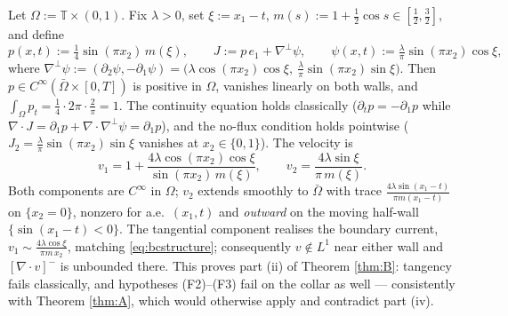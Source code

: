 \documentclass[11pt]{amsart}
\theoremstyle{definition}
\newcommand{\dive}{\nabla\!\cdot}
\newcommand{\T}{\mathbb{T}}
\begin{document}
Let $\Omega:=\T\times(0,1)$. Fix $\lambda>0$, set $\xi:=x_1-t$,
$m(s):=1+\tfrac12\cos s\in[\tfrac12,\tfrac32]$, and define
\begin{equation}\label{eq:bce}
p(x,t):=\tfrac14\sin(\pi x_2)\,m(\xi),\qquad
J:=p\,e_1+\nabla^\perp\psi,\qquad
\psi(x,t):=\tfrac{\lambda}{\pi}\sin(\pi x_2)\cos\xi,
\end{equation}
where $\nabla^\perp\psi:=(\partial_2\psi,-\partial_1\psi)=
\big(\lambda\cos(\pi x_2)\cos\xi,\ \tfrac{\lambda}{\pi}\sin(\pi
x_2)\sin\xi\big)$. Then $p\in C^\infty(\bar\Omega\times[0,T])$ is
positive in $\Omega$, vanishes linearly on both walls, and
$\int_\Omega p_t=\tfrac14\cdot2\pi\cdot\tfrac2\pi=1$. The continuity
equation holds classically ($\partial_tp=-\partial_1p$ while
$\dive J=\partial_1p+\dive\nabla^\perp\psi=\partial_1p$), and the
no-flux condition holds pointwise
($J_2=\tfrac{\lambda}{\pi}\sin(\pi x_2)\sin\xi$ vanishes at
$x_2\in\{0,1\}$). The velocity is
\begin{equation}\label{eq:bcv}
v_1=1+\frac{4\lambda\cos(\pi x_2)\cos\xi}{\sin(\pi x_2)\,m(\xi)},
\qquad
v_2=\frac{4\lambda\sin\xi}{\pi\,m(\xi)} .
\end{equation}
Both components are $C^\infty$ in $\Omega$; $v_2$ extends smoothly to
$\bar\Omega$ with trace $\tfrac{4\lambda\sin(x_1-t)}{\pi m(x_1-t)}$
on $\{x_2=0\}$, nonzero for a.e.\ $(x_1,t)$ and \emph{outward} on the
moving half-wall $\{\sin(x_1-t)<0\}$. The tangential component
realises the boundary current,
$v_1\sim\tfrac{4\lambda\cos\xi}{\pi m\,x_2}$, matching
\eqref{eq:bcstructure}; consequently $v\notin L^1$ near either wall
and $[\dive v]^-$ is unbounded there. This proves part (ii) of
Theorem \ref{thm:B}: tangency fails classically, and hypotheses
\textup{(F2)--(F3)} fail on the collar as well --- consistently with
Theorem \ref{thm:A}, which would otherwise apply and contradict part
(iv).
\end{document}
